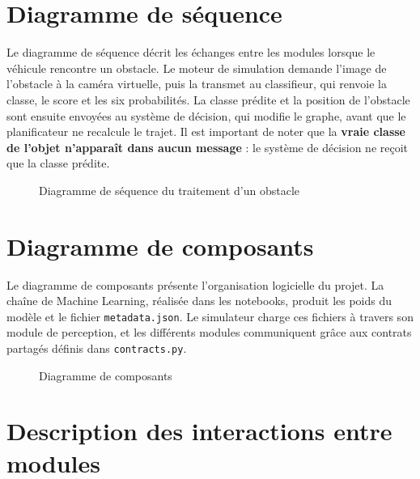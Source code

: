 \section{Diagramme de séquence}

Le diagramme de séquence décrit les échanges entre les modules lorsque le véhicule rencontre un obstacle. Le moteur de simulation demande l'image de l'obstacle à la caméra virtuelle, puis la transmet au classifieur, qui renvoie la classe, le score et les six probabilités. La classe prédite et la position de l'obstacle sont ensuite envoyées au système de décision, qui modifie le graphe, avant que le planificateur ne recalcule le trajet. Il est important de noter que la \textbf{vraie classe de l'objet n'apparaît dans aucun message} : le système de décision ne reçoit que la classe prédite.

\begin{figure}[H]
  \centering
  \resizebox{\textwidth}{!}{}
  \caption{Diagramme de séquence du traitement d'un obstacle}
\end{figure}

\section{Diagramme de composants}

Le diagramme de composants présente l'organisation logicielle du projet. La chaîne de Machine Learning, réalisée dans les notebooks, produit les poids du modèle et le fichier \texttt{metadata.json}. Le simulateur charge ces fichiers à travers son module de perception, et les différents modules communiquent grâce aux contrats partagés définis dans \texttt{contracts.py}.

\begin{figure}[H]
  \centering
  \resizebox{\textwidth}{!}{}
  \caption{Diagramme de composants}
\end{figure}

\section{Description des interactions entre modules}

